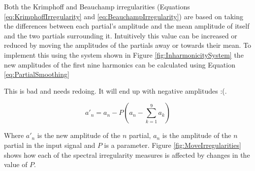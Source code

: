 			Both the Krimphoff and Beauchamp irregularities (Equations \ref{eq:KrimphoffIrregularity} and
			\ref{eq:BeauchampIrregularity}) are based on taking the differences between each partial's
			amplitude and the mean amplitude of itself and the two partials surrounding it. Intuitively this
			value can be increased or reduced by moving the amplitudes of the partials away or towards their
			mean. To implement this using the system shown in Figure \ref{fig:InharmonicitySystem} the new
			amplitudes of the first nine harmonics can be calculated using Equation \ref{eq:PartialSmoothing}
			
			\note
			{
				This is bad and needs redoing. It will end up with negative amplitudes :(.
			}

			\begin{equation}
				a'_{n} = a_{n} - P \left(a_{n} - \sum_{k = 1}^{9} a_{k} \right)
				\label{eq:PartialSmoothing}
			\end{equation}

			Where $a'_{n}$ is the new amplitude of the $n$ partial, $a_{n}$ is the amplitude of the
			$n$ partial in the input signal and $P$ is a parameter. Figure
			\ref{fig:MoveIrregularities} shows how each of the spectral irregularity measures is affected by
			changes in the value of $P$.

